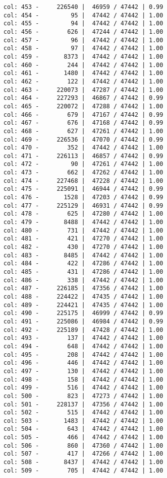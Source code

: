 \documentclass[11pt]{article}
\begin{document}
\begin{Verbatim}[commandchars=\\\{\}]
col: 453 -     226540 |  46959 / 47442 | 0.99
col: 454 -         95 |  47442 / 47442 | 1.00
col: 455 -         94 |  47442 / 47442 | 1.00
col: 456 -        626 |  47244 / 47442 | 1.00
col: 457 -         96 |  47442 / 47442 | 1.00
col: 458 -         97 |  47442 / 47442 | 1.00
col: 459 -       8373 |  47442 / 47442 | 1.00
col: 460 -        244 |  47442 / 47442 | 1.00
col: 461 -       1480 |  47442 / 47442 | 1.00
col: 462 -        122 |  47442 / 47442 | 1.00
col: 463 -     220073 |  47287 / 47442 | 1.00
col: 464 -     227293 |  46867 / 47442 | 0.99
col: 465 -     220072 |  47288 / 47442 | 1.00
col: 466 -        679 |  47167 / 47442 | 0.99
col: 467 -        676 |  47168 / 47442 | 0.99
col: 468 -        627 |  47261 / 47442 | 1.00
col: 469 -     226536 |  47070 / 47442 | 0.99
col: 470 -        352 |  47442 / 47442 | 1.00
col: 471 -     226113 |  46857 / 47442 | 0.99
col: 472 -         90 |  47261 / 47442 | 1.00
col: 473 -        662 |  47262 / 47442 | 1.00
col: 474 -     227468 |  47228 / 47442 | 1.00
col: 475 -     225091 |  46944 / 47442 | 0.99
col: 476 -       1528 |  47203 / 47442 | 0.99
col: 477 -     225129 |  46931 / 47442 | 0.99
col: 478 -        625 |  47280 / 47442 | 1.00
col: 479 -       8488 |  47442 / 47442 | 1.00
col: 480 -        731 |  47442 / 47442 | 1.00
col: 481 -        421 |  47270 / 47442 | 1.00
col: 482 -        430 |  47270 / 47442 | 1.00
col: 483 -       8485 |  47442 / 47442 | 1.00
col: 484 -        422 |  47286 / 47442 | 1.00
col: 485 -        431 |  47286 / 47442 | 1.00
col: 486 -        338 |  47442 / 47442 | 1.00
col: 487 -     226185 |  47356 / 47442 | 1.00
col: 488 -     224422 |  47435 / 47442 | 1.00
col: 489 -     224421 |  47435 / 47442 | 1.00
col: 490 -     225175 |  46999 / 47442 | 0.99
col: 491 -     225086 |  46984 / 47442 | 0.99
col: 492 -     225189 |  47428 / 47442 | 1.00
col: 493 -        137 |  47442 / 47442 | 1.00
col: 494 -        648 |  47442 / 47442 | 1.00
col: 495 -        208 |  47442 / 47442 | 1.00
col: 496 -        446 |  47442 / 47442 | 1.00
col: 497 -        130 |  47442 / 47442 | 1.00
col: 498 -        158 |  47442 / 47442 | 1.00
col: 499 -        516 |  47442 / 47442 | 1.00
col: 500 -        823 |  47273 / 47442 | 1.00
col: 501 -     228137 |  47356 / 47442 | 1.00
col: 502 -        515 |  47442 / 47442 | 1.00
col: 503 -       1483 |  47442 / 47442 | 1.00
col: 504 -        643 |  47442 / 47442 | 1.00
col: 505 -        466 |  47442 / 47442 | 1.00
col: 506 -        860 |  47360 / 47442 | 1.00
col: 507 -        417 |  47266 / 47442 | 1.00
col: 508 -       8437 |  47442 / 47442 | 1.00
col: 509 -        705 |  47442 / 47442 | 1.00

\end{Verbatim}
\end{document}
